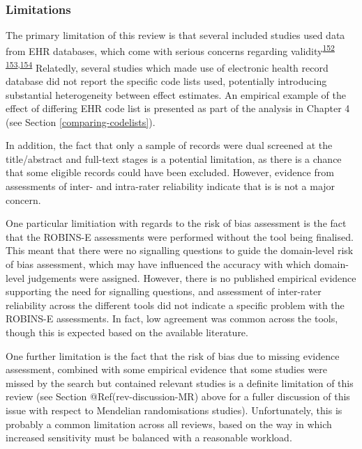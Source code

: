 \documentclass[a4paper, twoside]{templates/ociamthesis}
\begin{document}
~

\hypertarget{limitations}{%
\subsubsection{Limitations}\label{limitations}}

The primary limitation of this review is that several included studies used data from EHR databases, which come with serious concerns regarding validity\textsuperscript{\protect\hyperlink{ref-hsieh2019}{152}} \textsuperscript{\protect\hyperlink{ref-mcguinness2019validity}{153},\protect\hyperlink{ref-wilkinson2018}{154}} Relatedly, several studies which made use of electronic health record database did not report the specific code lists used, potentially introducing substantial heterogeneity between effect estimates. An empirical example of the effect of differing EHR code list is presented as part of the analysis in Chapter 4 (see Section \ref{comparing-codelists}).

In addition, the fact that only a sample of records were dual screened at the title/abstract and full-text stages is a potential limitation, as there is a chance that some eligible records could have been excluded. However, evidence from assessments of inter- and intra-rater reliability indicate that is is not a major concern.

One particular limitiation with regards to the risk of bias assessment is the fact that the ROBINS-E assessments were performed without the tool being finalised. This meant that there were no signalling questions to guide the domain-level risk of bias assessment, which may have influenced the accuracy with which domain-level judgements were assigned. However, there is no published empirical evidence supporting the need for signalling questions, and assessment of inter-rater reliability across the different tools did not indicate a specific problem with the ROBINS-E assessments. In fact, low agreement was common across the tools, though this is expected based on the available literature.

One further limitation is the fact that the risk of bias due to missing evidence assessment, combined with some empirical evidence that some studies were missed by the search but contained relevant studies is a definite limitation of this review (see Section @Ref(rev-discussion-MR) above for a fuller discussion of this issue with respect to Mendelian randomisations studies). Unfortunately, this is probably a common limitation across all reviews, based on the way in which increased sensitivity must be balanced with a reasonable workload.
\end{document}
